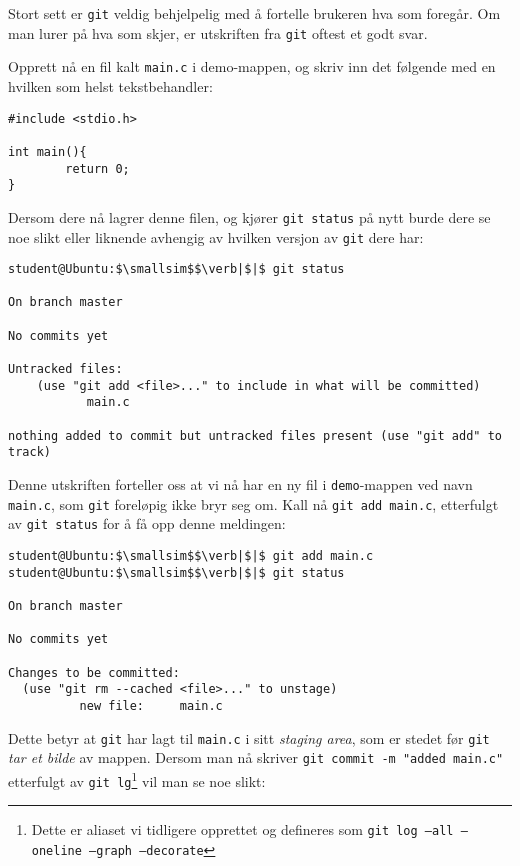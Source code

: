 \begin{alphasection}
Stort sett er \verb|git| veldig behjelpelig med å fortelle brukeren hva som foregår. Om man lurer på hva som skjer, er utskriften fra \verb|git| oftest et godt svar.

Opprett nå en fil kalt \verb|main.c| i demo-mappen, og skriv inn det følgende med en hvilken som helst tekstbehandler:

\begin{lstlisting}
#include <stdio.h>

int main(){
        return 0;
}
\end{lstlisting}

Dersom dere nå lagrer denne filen, og kjører \verb|git status| på nytt burde dere se noe slikt eller liknende avhengig av hvilken versjon av \verb|git| dere har:

\begin{lstlisting}[mathescape=true]
student@Ubuntu:$\smallsim$$\verb|$|$ git status

On branch master

No commits yet

Untracked files:
    (use "git add <file>..." to include in what will be committed)
           main.c

nothing added to commit but untracked files present (use "git add" to track)
\end{lstlisting}

Denne utskriften forteller oss at vi nå har en ny fil i \verb|demo|-mappen ved navn \verb|main.c|, som \verb|git| foreløpig ikke bryr seg om. Kall nå \verb|git add main.c|, etterfulgt av \verb|git status| for å få opp denne meldingen:

\begin{lstlisting}[mathescape=true]
student@Ubuntu:$\smallsim$$\verb|$|$ git add main.c
student@Ubuntu:$\smallsim$$\verb|$|$ git status

On branch master

No commits yet

Changes to be committed:
  (use "git rm --cached <file>..." to unstage)
	      new file:     main.c
\end{lstlisting}

Dette betyr at \verb|git| har lagt til \verb|main.c| i sitt \textit{staging area}, som er stedet før \verb|git| \textit{tar et bilde} av mappen. Dersom man nå skriver \verb|git commit -m "added main.c"| etterfulgt av \verb|git lg|\footnote{Dette er aliaset vi tidligere opprettet og defineres som \texttt{git log --all --oneline --graph --decorate}} vil man se noe slikt:


\end{alphasection}
